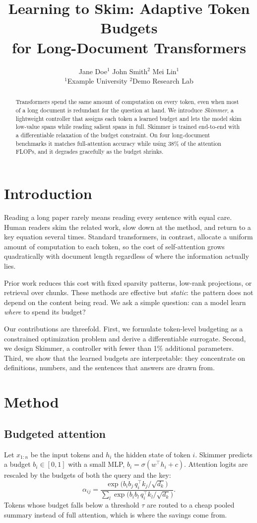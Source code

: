 \documentclass[10pt,twocolumn]{article}
\title{\Large\bfseries Learning to Skim: Adaptive Token Budgets\\for Long-Document Transformers}
\author{Jane Doe$^{1}$ \quad John Smith$^{2}$ \quad Mei Lin$^{1}$\\[2pt]
{\small $^{1}$Example University \quad $^{2}$Demo Research Lab}}
\date{}
\begin{document}
\maketitle
\begin{abstract}
Transformers spend the same amount of computation on every token, even when most of a long document is redundant for the question at hand. We introduce \emph{Skimmer}, a lightweight controller that assigns each token a learned budget and lets the model skim low-value spans while reading salient spans in full. Skimmer is trained end-to-end with a differentiable relaxation of the budget constraint. On four long-document benchmarks it matches full-attention accuracy while using 38\% of the attention FLOPs, and it degrades gracefully as the budget shrinks.
\end{abstract}

\section{Introduction}
Reading a long paper rarely means reading every sentence with equal care. Human readers skim the related work, slow down at the method, and return to a key equation several times. Standard transformers, in contrast, allocate a uniform amount of computation to each token, so the cost of self-attention grows quadratically with document length regardless of where the information actually lies.

Prior work reduces this cost with fixed sparsity patterns, low-rank projections, or retrieval over chunks. These methods are effective but \emph{static}: the pattern does not depend on the content being read. We ask a simple question: can a model learn \emph{where} to spend its budget?

Our contributions are threefold. First, we formulate token-level budgeting as a constrained optimization problem and derive a differentiable surrogate. Second, we design Skimmer, a controller with fewer than 1\% additional parameters. Third, we show that the learned budgets are interpretable: they concentrate on definitions, numbers, and the sentences that answers are drawn from.

\section{Method}
\subsection{Budgeted attention}
Let $x_{1:n}$ be the input tokens and $h_i$ the hidden state of token $i$. Skimmer predicts a budget $b_i \in [0,1]$ with a small MLP, $b_i = \sigma(w^\top h_i + c)$. Attention logits are rescaled by the budgets of both the query and the key:
\begin{equation}
\alpha_{ij} = \frac{\exp\!\big(b_i b_j \, q_i^\top k_j / \sqrt{d_k}\big)}{\sum_{l} \exp\!\big(b_i b_l \, q_i^\top k_l / \sqrt{d_k}\big)}.
\end{equation}
Tokens whose budget falls below a threshold $\tau$ are routed to a cheap pooled summary instead of full attention, which is where the savings come from.
\end{document}
